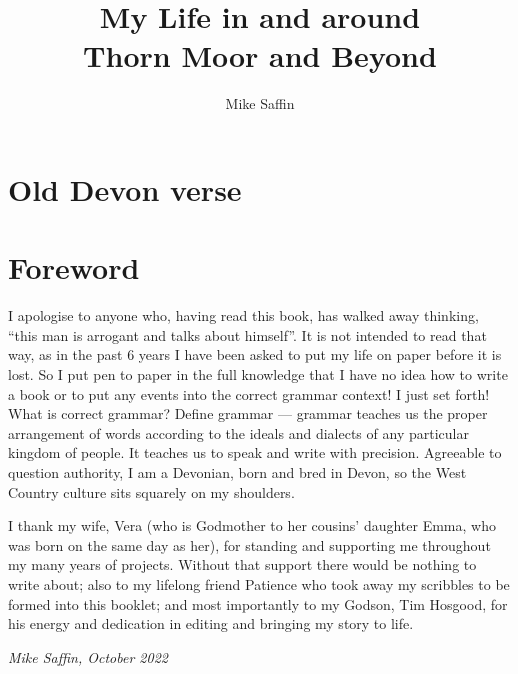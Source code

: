 \documentclass[twoside,11pt,a5paper]{memoir}
\title{My Life in and around\\Thorn Moor and Beyond}
\author{Mike Saffin}
\date{}
\begin{document}
% 

\maketitle

\chapter*{Old Devon verse}


\chapter*{Foreword}

I apologise to anyone who, having read this book, has walked away thinking,
``this man is arrogant and talks about himself''. It is not intended to read
that way, as in the past 6 years I have been asked to put my life on paper
before it is lost. So I put pen to paper in the full knowledge that I have no
idea how to write a book or to put any events into the correct grammar
context! I just set forth! What is correct grammar? Define grammar --- grammar
teaches us the proper arrangement of words according to the ideals and dialects
of any particular kingdom of people. It teaches us to speak and write with
precision. Agreeable to question authority, I am a Devonian, born and bred in
Devon, so the West Country culture sits squarely on my shoulders.

I thank my wife, Vera (who is Godmother to her cousins’ daughter Emma, who was
born on the same day as her), for standing and supporting me throughout my many
years of projects. Without that support there would be nothing to write about;
also to my lifelong friend Patience who took away my scribbles to be formed
into this booklet; and most importantly to my Godson, Tim Hosgood, for his
energy and dedication in editing and bringing my story to life.

\bigskip

\emph{Mike Saffin, October 2022}

\chapter{}


\chapter{}

\chapter{}

\end{document}
